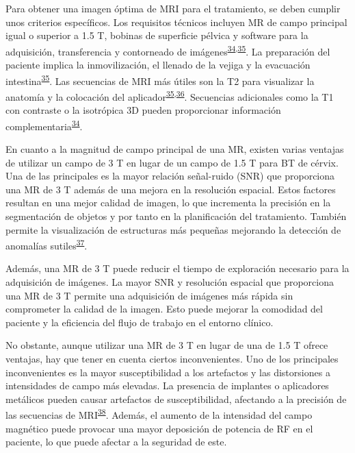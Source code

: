 \documentclass[
  a4paper,
]{scrreprt}
\begin{document}
Para obtener una imagen óptima de MRI para el tratamiento, se deben
cumplir unos criterios específicos. Los requisitos técnicos incluyen MR
de campo principal igual o superior a 1.5 T, bobinas de superficie
pélvica y software para la adquisición, transferencia y contorneado de
imágenes\textsuperscript{\protect\hyperlink{ref-richart2018}{34},\protect\hyperlink{ref-dimopoulos2012}{35}}.
La preparación del paciente implica la inmovilización, el llenado de la
vejiga y la evacuación
intestina\textsuperscript{\protect\hyperlink{ref-dimopoulos2012}{35}}.
Las secuencias de MRI más útiles son la T2 para visualizar la anatomía y
la colocación del
aplicador\textsuperscript{\protect\hyperlink{ref-dimopoulos2012}{35},\protect\hyperlink{ref-petric2014}{36}}.
Secuencias adicionales como la T1 con contraste o la isotrópica 3D
pueden proporcionar información
complementaria\textsuperscript{\protect\hyperlink{ref-richart2018}{34}}.

En cuanto a la magnitud de campo principal de una MR, existen varias
ventajas de utilizar un campo de 3 T en lugar de un campo de 1.5 T para
BT de cérvix. Una de las principales es la mayor relación señal-ruido
(SNR) que proporciona una MR de 3 T además de una mejora en la
resolución espacial. Estos factores resultan en una mejor calidad de
imagen, lo que incrementa la precisión en la segmentación de objetos y
por tanto en la planificación del tratamiento. También permite la
visualización de estructuras más pequeñas mejorando la detección de
anomalías
sutiles\textsuperscript{\protect\hyperlink{ref-kataoka2007}{37}}.

Además, una MR de 3 T puede reducir el tiempo de exploración necesario
para la adquisición de imágenes. La mayor SNR y resolución espacial que
proporciona una MR de 3 T permite una adquisición de imágenes más rápida
sin comprometer la calidad de la imagen. Esto puede mejorar la comodidad
del paciente y la eficiencia del flujo de trabajo en el entorno clínico.

No obstante, aunque utilizar una MR de 3 T en lugar de una de 1.5 T
ofrece ventajas, hay que tener en cuenta ciertos inconvenientes. Uno de
los principales inconvenientes es la mayor susceptibilidad a los
artefactos y las distorsiones a intensidades de campo más elevadas. La
presencia de implantes o aplicadores metálicos pueden causar artefactos
de susceptibilidad, afectando a la precisión de las secuencias de
MRI\textsuperscript{\protect\hyperlink{ref-kumar2020}{38}}. Además, el
aumento de la intensidad del campo magnético puede provocar una mayor
deposición de potencia de RF en el paciente, lo que puede afectar a la
seguridad de este.
\end{document}

